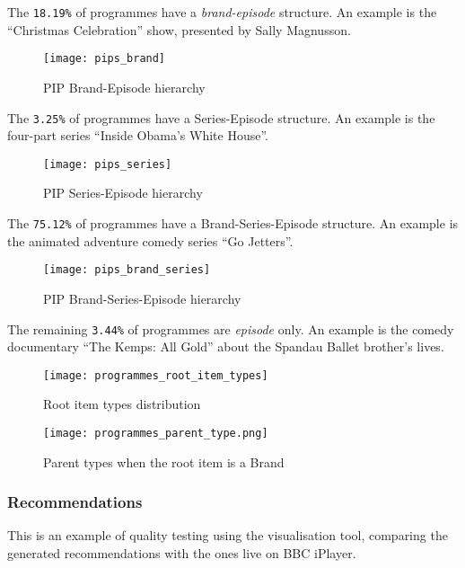 The \verb|18.19%| of programmes have a \textit{brand-episode} structure.
An example is the ``Christmas Celebration'' show, presented by Sally Magnusson.

\begin{figure}[H]
  \centering
  \texttt{[image: pips\_brand]}
  \caption{PIP Brand-Episode hierarchy}
  \label{fig:pips_brand}
\end{figure}

The \verb|3.25%| of programmes have a Series-Episode structure.
An example is the four-part series ``Inside Obama's White House''.

\begin{figure}[H]
  \centering
  \texttt{[image: pips\_series]}
  \caption{PIP Series-Episode hierarchy}
  \label{fig:pips_series}
\end{figure}

The \verb|75.12%| of programmes have a Brand-Series-Episode structure.
An example is the animated adventure comedy series ``Go Jetters''.

\begin{figure}[H]
  \centering
  \texttt{[image: pips\_brand\_series]}
  \caption{PIP Brand-Series-Episode hierarchy}
  \label{fig:pips_brand_series}
\end{figure}

The remaining \verb|3.44%| of programmes are \textit{episode} only.
An example is the comedy documentary ``The Kemps: All Gold'' about the Spandau Ballet brother's lives.

\begin{figure}[H]
  \centering
  \texttt{[image: programmes\_root\_item\_types]}
  \caption{Root item types distribution}
  \label{fig:programmes_root_item_types}
\end{figure}

\begin{figure}[H]
  \centering
  \texttt{[image: programmes\_parent\_type.png]}
  \caption{Parent types when the root item is a Brand}
  \label{fig:programmes_parent_type}
\end{figure}

\subsubsection{Recommendations}

This is an example of quality testing using the visualisation tool, comparing the generated recommendations
with the ones live on BBC iPlayer.

